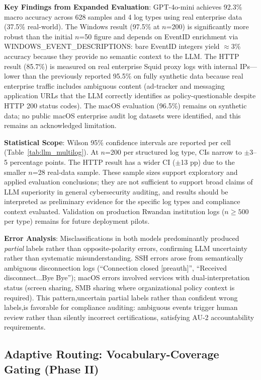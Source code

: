 \documentclass[futureinternet,article,submit,pdftex,moreauthors]{Definitions/mdpi}
\begin{document}
\textbf{Key Findings from Expanded Evaluation}:
GPT-4o-mini achieves 92.3\% macro accuracy across 628 samples and 4 log types using
real enterprise data (37.5\% real-world). The Windows result (97.5\% at $n$=200) is
significantly more robust than the initial $n$=50 figure and depends on EventID
enrichment via WINDOWS\_EVENT\_DESCRIPTIONS: bare EventID integers yield $\approx$3\%
accuracy because they provide no semantic context to the LLM. The HTTP result (85.7\%)
is measured on real enterprise Squid proxy logs with internal IPs---lower than the
previously reported 95.5\% on fully synthetic data because real enterprise traffic
includes ambiguous content (ad-tracker and messaging application URLs that the LLM
correctly identifies as policy-questionable despite HTTP 200 status codes).
The macOS evaluation (96.5\%) remains on synthetic data; no public macOS enterprise
audit log datasets were identified, and this remains an acknowledged limitation.

\textbf{Statistical Scope}: Wilson 95\% confidence intervals are reported per cell
(Table~\ref{tab:llm_multilog}). At $n$=200 per structured log type, CIs narrow to
$\pm$3--5 percentage points. The HTTP result has a wider CI ($\pm$13 pp) due to the
smaller $n$=28 real-data sample. These sample sizes support exploratory and
applied evaluation conclusions; they are not sufficient to support broad claims of
LLM superiority in general cybersecurity auditing, and results should be interpreted
as preliminary evidence for the specific log types and compliance context evaluated.
Validation on production Rwandan institution logs ($n \geq 500$ per type) remains
for future deployment pilots.

\textbf{Error Analysis}: Misclassifications in both models predominantly produced
\textit{partial} labels rather than opposite-polarity errors, confirming LLM uncertainty
rather than systematic misunderstanding. SSH errors arose from semantically ambiguous
disconnection logs (``Connection closed [preauth]'', ``Received disconnect...Bye Bye'');
macOS errors involved services with dual-interpretation status (screen sharing, SMB sharing
where organizational policy context is required). This pattern,uncertain partial labels
rather than confident wrong labels,is favorable for compliance auditing: ambiguous events
trigger human review rather than silently incorrect certifications, satisfying AU-2
accountability requirements.

\subsection{Adaptive Routing: Vocabulary-Coverage Gating (Phase II)}
\label{sec:phase2_router}
\end{document}
